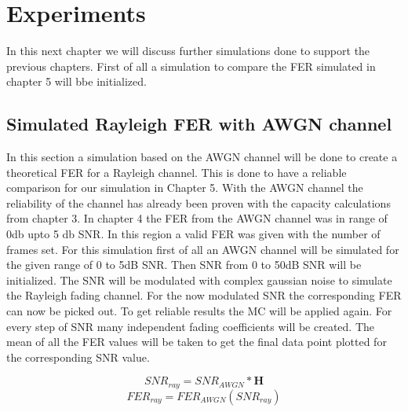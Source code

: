 \chapter{Experiments} \label{chap:Experiments}
\graphicspath{{C:/Users/Kevin/Bachelarbeit/Bachelorarbeit/01_Bachelorarbeit_LaTex/02_Figures/}}

In this next chapter we will discuss further simulations done to support the previous chapters. First of all a simulation to compare the \gls{FER} simulated in chapter 5 will bbe initialized.

\section{Simulated Rayleigh FER with AWGN channel}
\label{RAYAWGN}

In this section a simulation based on the AWGN channel will be done to create a theoretical \gls{FER} for a Rayleigh channel. This is done to have a reliable comparison for our simulation in Chapter 5. 
With the AWGN channel the reliability of the channel has already been proven with the capacity calculations from chapter 3. In chapter 4 the \gls{FER} from the AWGN channel was in range of 0db upto 5 db SNR. In this region a valid \gls{FER} was given with the number of frames set. 
For this simulation first of all an AWGN channel will be simulated for the given range of 0 to 5dB SNR. Then SNR from 0 to 50dB SNR will be initialized. The SNR will be modulated with complex gaussian noise to simulate the Rayleigh fading channel. For the now modulated SNR the corresponding \gls{FER} can now be picked out. To get reliable results the \gls{MC} will be applied again. For every step of SNR many independent fading coefficients will be created. The mean of all the \gls{FER} values will be taken to get the final data point plotted for the corresponding \gls{SNR} value.    

\begin{equation}
SNR_{ray} = SNR_{AWGN} * \textbf{H}
\end{equation}
\begin{equation}
FER_{ray} = FER_{AWGN}(SNR_{ray})
\end{equation}

